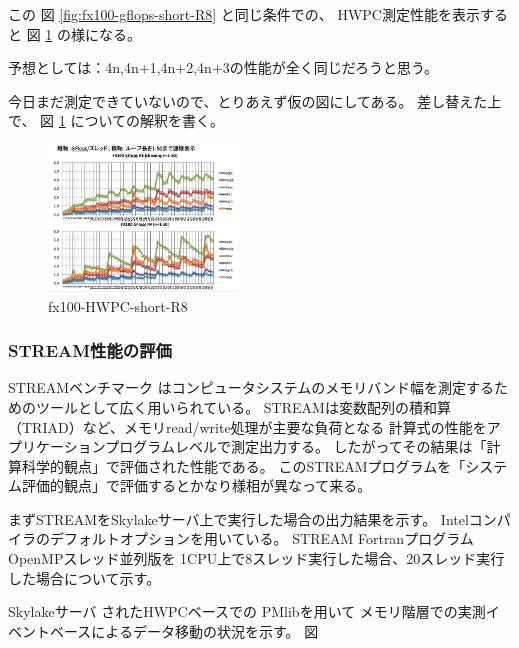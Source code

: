 \documentclass[submit,techrep,noauthor]{ipsj}
\begin{document}

この
図 \ref{fig:fx100-gflops-short-R8}
と同じ条件での、
HWPC測定性能を表示すると
図 \ref{fig:fx100-HWPC-short-R8}
の様になる。
{\color{blue} \par
予想としては：4n,4n+1,4n+2,4n+3の性能が全く同じだろうと思う。

今日まだ測定できていないので、とりあえず仮の図にしてある。
差し替えた上で、
図 \ref{fig:fx100-HWPC-short-R8}
についての解釈を書く。

} \par




\begin{figure}[tb]
\centering\includegraphics[width=0.45\textwidth]{figs/fx100-HWPC-short-R8}
\caption{fx100-HWPC-short-R8}
\label{fig:fx100-HWPC-short-R8}
\end{figure}




\subsubsection{STREAM性能の評価}
STREAMベンチマーク\cite{stream:1995}
はコンピュータシステムのメモリバンド幅を測定するためのツールとして広く用いられている。
STREAMは変数配列の積和算（TRIAD）など、メモリread/write処理が主要な負荷となる
計算式の性能をアプリケーションプログラムレベルで測定出力する。
したがってその結果は「計算科学的観点」で評価された性能である。
このSTREAMプログラムを「システム評価的観点」で評価するとかなり様相が異なって来る。

まずSTREAMをSkylakeサーバ上で実行した場合の出力結果を示す。
Intelコンパイラのデフォルトオプションを用いている。
STREAM FortranプログラムOpenMPスレッド並列版を
1CPU上で8スレッド実行した場合、20スレッド実行した場合について示す。


Skylakeサーバ
されたHWPCベースでの
PMlibを用いて
メモリ階層での実測イベントベースによるデータ移動の状況を示す。
図
\end{document}
